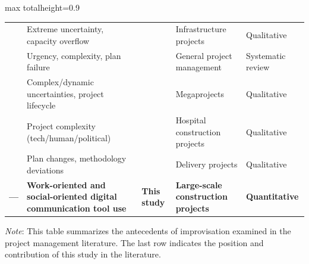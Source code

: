 \documentclass[authoryear,preprint,review,times,10pt]{elsarticle}
\begin{document}
\begin{landscape}
\begin{adjustbox}{max totalheight=0.9\textwidth}
\begin{threeparttable}
\begin{tabularx}{1.5\textheight}{>{\raggedright\arraybackslash}p{4cm}>{\raggedright\arraybackslash}X>{\raggedright\arraybackslash}X>{\raggedright\arraybackslash}X>{\raggedright\arraybackslash}p{3cm}}
  & Extreme uncertainty, capacity overflow & \citet{hacker2019Legitimizing} & Infrastructure projects & Qualitative \\
  & Urgency, complexity, plan failure & \citet{malucelli2021Facing} & General project management & Systematic review \\
  & Complex/dynamic uncertainties, project lifecycle & \citet{jiang2023Toward} & Megaprojects & Qualitative \\
  & Project complexity (tech/human/political) & \citet{mamedio2020Managing} & Hospital construction projects & Qualitative \\
  & Plan changes, methodology deviations & \citet{vuorinen2019Lifecycle} & Delivery projects & Qualitative \\
\midrule
\textbf{---} & \textbf{Work-oriented and social-oriented digital communication tool use} & \textbf{This study} & \textbf{Large-scale construction projects} & \textbf{Quantitative} \\
\bottomrule
\end{tabularx}
\begin{tablenotes}[flushleft]
\small\linespread{1}\selectfont
\item \textit{Note}: This table summarizes the antecedents of improvisation examined in the project management literature. The last row indicates the position and contribution of this study in the literature.
\end{tablenotes}
\end{threeparttable}
\end{adjustbox}
\end{landscape}
\end{document}
